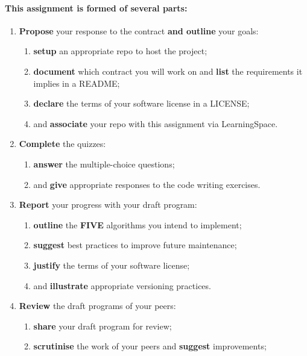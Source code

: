 \documentclass{../../fal_assignment}
\begin{document}
\paragraph{This assignment is formed of several parts:}

\begin{enumerate}
\setlength{\itemindent}{8pt}
    \item \textbf{Propose} your response to the contract \textbf{and outline} your goals:
    	\begin{enumerate}
    		\item \textbf{setup} an appropriate repo to host the project;
    		\item \textbf{document} which contract you will work on and \textbf{list} the requirements it implies in a README;
    		\item \textbf{declare} the terms of your software license in a LICENSE;
    		\item and \textbf{associate} your repo with this assignment via LearningSpace.
	\end{enumerate}
    \item \textbf{Complete} the quizzes:
    	\begin{enumerate}
    		\item \textbf{answer} the multiple-choice questions;
    		\item and \textbf{give} appropriate responses to the code writing exercises.
	\end{enumerate}
    \item \textbf{Report} your progress with your draft program:
    	\begin{enumerate}
    		\item \textbf{outline} the \textbf{FIVE} algorithms you intend to implement;
    		\item \textbf{suggest} best practices to improve future maintenance;
    		\item \textbf{justify} the terms of your software license;
    		\item and \textbf{illustrate} appropriate versioning practices.
	\end{enumerate}
    \item \textbf{Review} the draft programs of your peers:
    	\begin{enumerate}
    		\item \textbf{share} your draft program for review;
      		\item \textbf{scrutinise} the work of your peers and \textbf{suggest} improvements;  		

\end{enumerate}
\end{enumerate}
\end{document}
